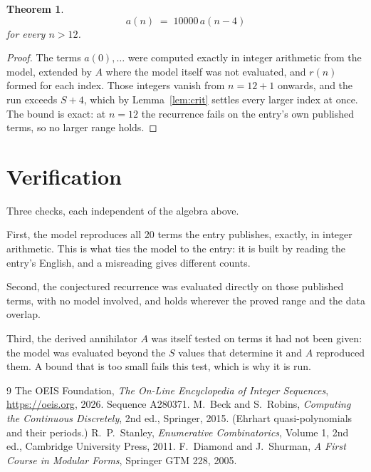 \documentclass[11pt,a4paper]{article}
\theoremstyle{plain}
\newtheorem{theorem}{Theorem}
\theoremstyle{definition}
\begin{document}
\begin{theorem}
\[
a(n)\;=\;10000\,a(n-4)
\]
for every $n>12$.
\end{theorem}

\begin{proof}
The terms $a(0),\dots$ were computed exactly in integer arithmetic from the model, extended by
$A$ where the model itself was not evaluated, and $r(n)$ formed for each index. Those integers
vanish from $n=12+1$ onwards, and the run exceeds $S+4$, which by
Lemma~\ref{lem:crit} settles every larger index at once. The bound is exact: at $n=12$ the recurrence fails on the entry's own published terms, so no larger range holds.
\end{proof}

\section{Verification}

Three checks, each independent of the algebra above.

First, the model reproduces all $20$ terms the entry publishes, exactly, in integer
arithmetic. This is what ties the model to the entry: it is built by reading the entry's
English, and a misreading gives different counts.

Second, the conjectured recurrence was evaluated directly on those published terms, with no
model involved, and holds wherever the proved range and the data overlap.

Third, the derived annihilator $A$ was itself tested on terms it had not been given: the model
was evaluated beyond the $S$ values that determine it and $A$ reproduced them. A bound that is
too small fails this test, which is why it is run.

\begin{thebibliography}{9}
 The OEIS Foundation, \emph{The On-Line Encyclopedia of Integer
Sequences}, \url{https://oeis.org}, 2026. Sequence A280371.
 M.~Beck and S.~Robins, \emph{Computing the Continuous Discretely},
2nd ed., Springer, 2015. (Ehrhart quasi-polynomials and their periods.)
 R.~P.~Stanley, \emph{Enumerative Combinatorics}, Volume 1, 2nd ed.,
Cambridge University Press, 2011.
 F.~Diamond and J.~Shurman, \emph{A First Course in Modular Forms},
Springer GTM 228, 2005.
\end{thebibliography}
\end{document}
